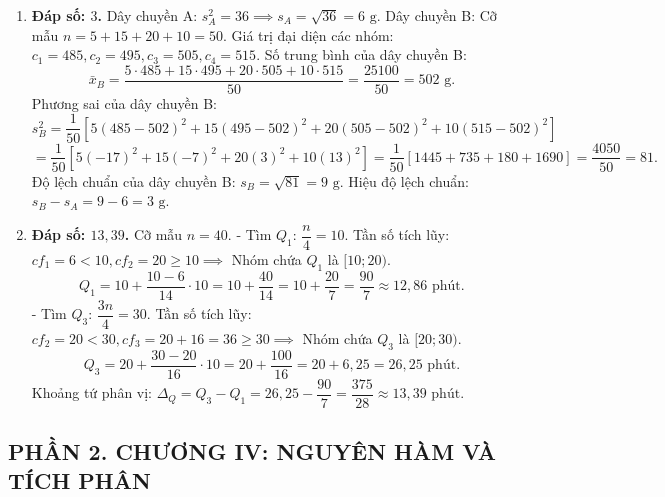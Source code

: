 \documentclass[12pt,a4paper]{article}
\begin{document}
\begin{enumerate}
\item \textbf{Đáp số: $3$.}  
Dây chuyền A: $s_A^2 = 36 \implies s_A = \sqrt{36} = 6\text{ g}$.  
Dây chuyền B: Cỡ mẫu $n = 5 + 15 + 20 + 10 = 50$.  
Giá trị đại diện các nhóm: $c_1 = 485, c_2 = 495, c_3 = 505, c_4 = 515$.  
Số trung bình của dây chuyền B:  
\[
\bar{x}_B = \dfrac{5 \cdot 485 + 15 \cdot 495 + 20 \cdot 505 + 10 \cdot 515}{50} = \dfrac{25100}{50} = 502\text{ g}.
\]
Phương sai của dây chuyền B:  
\[
s_B^2 = \dfrac{1}{50}\left[ 5(485-502)^2 + 15(495-502)^2 + 20(505-502)^2 + 10(515-502)^2 \right]
\]
\[
= \dfrac{1}{50}\left[ 5(-17)^2 + 15(-7)^2 + 20(3)^2 + 10(13)^2 \right] = \dfrac{1}{50}[1445 + 735 + 180 + 1690] = \dfrac{4050}{50} = 81.
\]
Độ lệch chuẩn của dây chuyền B: $s_B = \sqrt{81} = 9\text{ g}$.  
Hiệu độ lệch chuẩn: $s_B - s_A = 9 - 6 = 3\text{ g}$.

\item \textbf{Đáp số: $13{,}39$.}  
Cỡ mẫu $n = 40$.  
- Tìm $Q_1$: $\dfrac{n}{4} = 10$. Tần số tích lũy: $cf_1 = 6 < 10, cf_2 = 20 \ge 10 \implies$ Nhóm chứa $Q_1$ là $[10; 20)$.  
\[
Q_1 = 10 + \dfrac{10 - 6}{14} \cdot 10 = 10 + \dfrac{40}{14} = 10 + \dfrac{20}{7} = \dfrac{90}{7} \approx 12{,}86\text{ phút}.
\]
- Tìm $Q_3$: $\dfrac{3n}{4} = 30$. Tần số tích lũy: $cf_2 = 20 < 30, cf_3 = 20 + 16 = 36 \ge 30 \implies$ Nhóm chứa $Q_3$ là $[20; 30)$.  
\[
Q_3 = 20 + \dfrac{30 - 20}{16} \cdot 10 = 20 + \dfrac{100}{16} = 20 + 6{,}25 = 26{,}25\text{ phút}.
\]
Khoảng tứ phân vị: $\Delta_Q = Q_3 - Q_1 = 26{,}25 - \dfrac{90}{7} = \dfrac{375}{28} \approx 13{,}39\text{ phút}$.
\end{enumerate}

\subsection*{PHẦN 2. CHƯƠNG IV: NGUYÊN HÀM VÀ TÍCH PHÂN}
\end{document}
